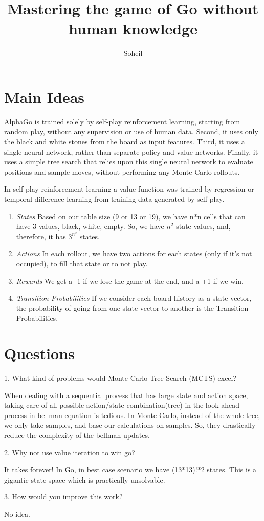 \documentclass{article}
\title{Mastering the game of Go without human knowledge}
\author{Soheil}
\date{}
\theoremstyle{remark}
\theoremstyle{remark}
\theoremstyle{remark}
\theoremstyle{remark}
\theoremstyle{remark}
\theoremstyle{remark}
\begin{document}
\maketitle
\section{Main Ideas}
AlphaGo is trained solely by self-play reinforcement learning, starting from random play, without any supervision or use of human data. Second, it uses only the black and white stones from the board as input features. Third, it uses a single neural network, rather than separate policy and value networks. Finally, it uses a simple tree search that relies upon this single neural network to evaluate positions and sample moves, without performing any Monte Carlo rollouts.

In self-play reinforcement learning a value function was trained by regression or temporal difference learning from training data generated by self play.


\begin{enumerate}
	\item \emph{States}
	Based on our table size (9 or 13 or 19), we have n*n cells that can have 3 values, black, white, empty. So, we have $n^2$ state values, and, therefore, it has $3^{n^2}$ states.
	\item \emph{Actions} In each rollout, we have two actions for each states (only if it's not occupied), to fill that state or to not play.
	\item \emph{Rewards}
	We get a -1 if we lose the game at the end, and a +1 if we win.
	\item \emph{Transition Probabilities}
	If we consider each board history as a state vector, the probability of going from one state vector to another is the Transition Probabilities.

\end{enumerate}
\section{Questions}

1. What kind of problems would Monte Carlo Tree Search 
(MCTS) excel?

When dealing with a sequential process that has large state and action space, taking care of all possible action/state combination(tree) in the look ahead process in bellman equation is tedious. In Monte Carlo, instead of the whole tree, we only take samples, and base our calculations on samples. So, they drastically reduce the complexity of the bellman updates.

2. Why not use value iteration to win go?

It takes forever! In Go, in best case scenario we have (13*13)!*2 states. This is a gigantic state space which is practically unsolvable.


3. How would you improve this work?

No idea.


\end{document}
